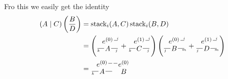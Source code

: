 \documentclass[oneside]{book}
\begin{document}
Fro this we easily get the identity
\begin{align}
\left(A \mid C\right) \left(\frac{B}{D}\right)
&=
\mathrm{stack}_i(A, C)
\,
\mathrm{stack}_i(B, D)
\\&=
\left(
\begin{tikzpicture}[baseline=-.5em, inner sep = 1pt]
    \node (e) at (0, .2) {$e^{(0)}$};
    \draw (e) -- ++(.5,0) node[midway, above right, font=\tiny] {$i$};
    \node (X) at (0, -.2) {$A$};
    \draw (X) -- ++(-.5,0) node[midway, below left, font=\tiny] {$k$};
    \draw (X) -- ++(.5,0) node[midway, below right, font=\tiny] {$j$};
\end{tikzpicture}
+
\begin{tikzpicture}[baseline=-.5em, inner sep = 1pt]
    \node (e) at (0, .2) {$e^{(1)}$};
    \draw (e) -- ++(.5,0) node[midway, above right, font=\tiny] {$i$};
    \node (X) at (0, -.2) {$C$};
    \draw (X) -- ++(-.5,0) node[midway, below left, font=\tiny] {$k$};
    \draw (X) -- ++(.5,0) node[midway, below right, font=\tiny] {$j$};
\end{tikzpicture}
\right)
\left(
\begin{tikzpicture}[baseline=-.5em, inner sep = 1pt]
    \node (e) at (0, .2) {$e^{(0)}$};
    \draw (e) -- ++(.5,0) node[midway, above right, font=\tiny] {$i$};
    \node (X) at (0, -.2) {$B$};
    \draw (X) -- ++(-.5,0) node[midway, below left, font=\tiny] {$j$};
    \draw (X) -- ++(.5,0) node[midway, below right, font=\tiny] {$m$};
\end{tikzpicture}
+
\begin{tikzpicture}[baseline=-.5em, inner sep = 1pt]
    \node (e) at (0, .2) {$e^{(1)}$};
    \draw (e) -- ++(.5,0) node[midway, above right, font=\tiny] {$i$};
    \node (X) at (0, -.2) {$D$};
    \draw (X) -- ++(-.5,0) node[midway, below left, font=\tiny] {$j$};
    \draw (X) -- ++(.5,0) node[midway, below right, font=\tiny] {$m$};
\end{tikzpicture}
\right)
\\&=
\begin{tikzpicture}[baseline=-.5em, inner sep = 1pt]
    \node (e) at (0, .2) {$e^{(0)}$};
    \draw (e) -- ++(.5,0);
    \node (X) at (0, -.2) {$A$};
    \draw (X) -- ++(.5,0);
    \draw (X) -- ++(-.5,0) node[midway, below left, font=\tiny] {$k$};
\end{tikzpicture}
\,
\begin{tikzpicture}[baseline=-.5em, inner sep = 1pt]
    \node (e) at (0, .2) {$e^{(0)}$};
    \draw (e) -- ++(-.5,0);
    \node (X) at (0, -.2) {$B$};

\end{tikzpicture}
\end{align}
\end{document}
